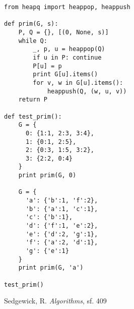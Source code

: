 \documentclass[12pt,fleqn]{article}\usepackage{../common}
\begin{document}
\begin{verbatim}
from heapq import heappop, heappush

def prim(G, s):
    P, Q = {}, [(0, None, s)]
    while Q:
        _, p, u = heappop(Q)
        if u in P: continue
        P[u] = p
        print G[u].items()
        for v, w in G[u].items():
            heappush(Q, (w, u, v))
    return P

def test_prim():    
    G = {
      0: {1:1, 2:3, 3:4},
      1: {0:1, 2:5},
      2: {0:3, 1:5, 3:2},
      3: {2:2, 0:4}
    }
    print prim(G, 0)

    G = {
      'a': {'b':1, 'f':2},
      'b': {'a':1, 'c':1},
      'c': {'b':1},
      'd': {'f':1, 'e':2},
      'e': {'d':2, 'g':1},
      'f': {'a':2, 'd':1},
      'g': {'e':1}
    }
    print prim(G, 'a')

test_prim()
\end{verbatim}



Sedgewick, R. {\em Algorithms}, sf. 409
\end{document}
